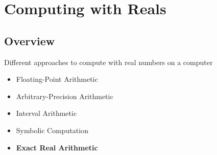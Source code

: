 \section{Computing with Reals}
\subsection{Overview}
\begin{frame}
  Different approaches to compute with real numbers on a computer
  \begin{itemize}[<+->]
      \item Floating-Point Arithmetic
      \item Arbitrary-Precision Arithmetic
      \item Interval Arithmetic
      \item Symbolic Computation
      \item \textbf{Exact Real Arithmetic}
  \end{itemize}
\end{frame}
